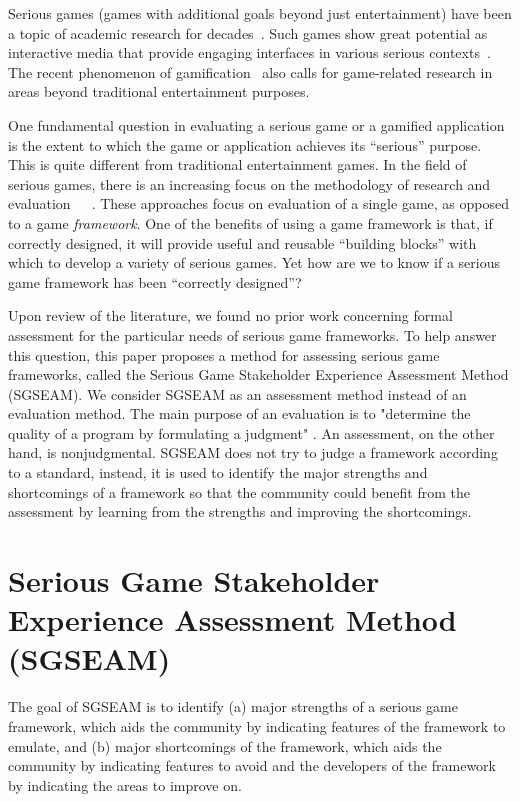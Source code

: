 \documentclass{sigchi}
\begin{document}
Serious games (games with additional goals beyond just entertainment) have been a topic
of academic research for decades~\cite{Zyda2005}. Such games show great potential as
interactive media that provide engaging interfaces in various serious
contexts~\cite{mcgonigal2011reality}. The recent phenomenon of
gamification~\cite{Deterding2011mt} also calls for game-related research in areas beyond
traditional entertainment purposes.

One fundamental question in evaluating a serious game or a gamified application is the 
extent to which the game or application achieves its ``serious'' purpose. This is quite different from traditional entertainment games. In the field of serious games, there is an increasing
focus on the methodology of research and evaluation~\cite{Mayer2012233}~\cite{de2006can}~\cite{harteveld2010triadic}. These approaches focus on evaluation of a single game, as opposed to a game {\em
  framework}. One of the benefits of 
using a game framework is that, if correctly designed, it will provide useful and
reusable ``building blocks'' with which to develop a variety of serious games. Yet how are we to know if a serious
game framework has been ``correctly designed''?

Upon review of the literature, we found no prior work concerning formal assessment for
the particular needs of serious game frameworks. To help answer this question, this paper
proposes a method for assessing serious game frameworks, called the Serious Game Stakeholder
Experience Assessment Method (SGSEAM). We consider
SGSEAM as an assessment method instead of an evaluation method. The main purpose of an
evaluation is to "determine the quality of a program by formulating a judgment"
\cite{hurteau2009legitimate}. An assessment, on the other hand, is nonjudgmental. SGSEAM does
not try to judge a framework according to a standard, instead, it is used to identify the major
strengths and shortcomings of a framework so that the community could benefit from the
assessment by learning from the strengths and improving the shortcomings.

\section{Serious Game Stakeholder Experience Assessment Method (SGSEAM)}

The goal of SGSEAM is to identify (a) major strengths of a serious game
framework, which aids the community by indicating features of the framework to emulate, and
(b) major shortcomings of the framework, which aids the community by indicating features to avoid
and the developers of the framework by indicating the areas to improve on.
\end{document}
